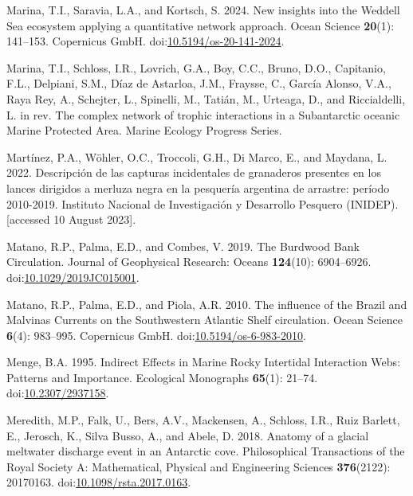 \documentclass[
]{article}
\newlength{\cslhangindent}
\newenvironment{CSLReferences}[2] %
 {\begin{list}{}{%
  \setlength{\itemindent}{0pt}
  \setlength{\leftmargin}{0pt}
  \setlength{\parsep}{0pt}
  \ifodd #1
   \setlength{\leftmargin}{\cslhangindent}
   \setlength{\itemindent}{-1\cslhangindent}
  \fi
  \setlength{\itemsep}{#2\baselineskip}}}
 {\end{list}}
\begin{document}
\begin{CSLReferences}{1}{0}
Marina, T.I., Saravia, L.A., and Kortsch, S. 2024. New insights into the
{Weddell Sea} ecosystem applying a quantitative network approach. Ocean
Science \textbf{20}(1): 141--153. Copernicus GmbH.
doi:\href{https://doi.org/10.5194/os-20-141-2024}{10.5194/os-20-141-2024}.

Marina, T.I., Schloss, I.R., Lovrich, G.A., Boy, C.C., Bruno, D.O.,
Capitanio, F.L., Delpiani, S.M., Díaz de Astarloa, J.M., Fraysse, C.,
García Alonso, V.A., Raya Rey, A., Schejter, L., Spinelli, M., Tatián,
M., Urteaga, D., and Riccialdelli, L. in rev. The complex network of
trophic interactions in a {Subantarctic} oceanic {Marine Protected
Area}. Marine Ecology Progress Series.

Martínez, P.A., Wöhler, O.C., Troccoli, G.H., Di Marco, E., and Maydana,
L. 2022. {Descripci{ó}n de las capturas incidentales de granaderos
presentes en los lances dirigidos a merluza negra en la pesquer{í}a
argentina de arrastre: per{í}odo 2010-2019.} Instituto Nacional de
Investigaci{ó}n y Desarrollo Pesquero (INIDEP). {[}accessed 10 August
2023{]}.

Matano, R.P., Palma, E.D., and Combes, V. 2019. The {Burdwood Bank
Circulation}. Journal of Geophysical Research: Oceans \textbf{124}(10):
6904--6926.
doi:\href{https://doi.org/10.1029/2019JC015001}{10.1029/2019JC015001}.

Matano, R.P., Palma, E.D., and Piola, A.R. 2010. The influence of the
{Brazil} and {Malvinas Currents} on the {Southwestern Atlantic Shelf}
circulation. Ocean Science \textbf{6}(4): 983--995. Copernicus GmbH.
doi:\href{https://doi.org/10.5194/os-6-983-2010}{10.5194/os-6-983-2010}.

Menge, B.A. 1995. Indirect {Effects} in {Marine Rocky Intertidal
Interaction Webs}: {Patterns} and {Importance}. Ecological Monographs
\textbf{65}(1): 21--74.
doi:\href{https://doi.org/10.2307/2937158}{10.2307/2937158}.

Meredith, M.P., Falk, U., Bers, A.V., Mackensen, A., Schloss, I.R., Ruiz
Barlett, E., Jerosch, K., Silva Busso, A., and Abele, D. 2018. Anatomy
of a glacial meltwater discharge event in an {Antarctic} cove.
Philosophical Transactions of the Royal Society A: Mathematical,
Physical and Engineering Sciences \textbf{376}(2122): 20170163.
doi:\href{https://doi.org/10.1098/rsta.2017.0163}{10.1098/rsta.2017.0163}.


\end{CSLReferences}
\end{document}
